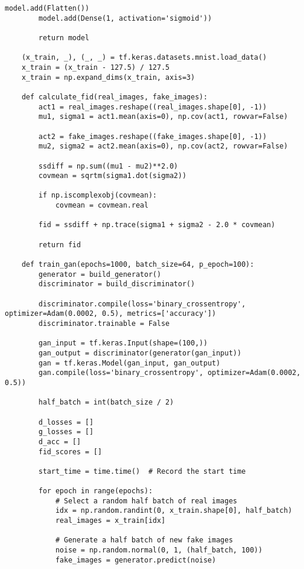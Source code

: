 \begin{lstlisting}[style=mypython, caption= {Explore GAN with 4 Convolutional Layers in Generator \\ and 3 Convolutional Layers in Discriminator}]
        model.add(Flatten())
        model.add(Dense(1, activation='sigmoid'))
    
        return model
    
    (x_train, _), (_, _) = tf.keras.datasets.mnist.load_data()
    x_train = (x_train - 127.5) / 127.5
    x_train = np.expand_dims(x_train, axis=3)
    
    def calculate_fid(real_images, fake_images):
        act1 = real_images.reshape((real_images.shape[0], -1))
        mu1, sigma1 = act1.mean(axis=0), np.cov(act1, rowvar=False)
        
        act2 = fake_images.reshape((fake_images.shape[0], -1))
        mu2, sigma2 = act2.mean(axis=0), np.cov(act2, rowvar=False)
        
        ssdiff = np.sum((mu1 - mu2)**2.0)
        covmean = sqrtm(sigma1.dot(sigma2))
        
        if np.iscomplexobj(covmean):
            covmean = covmean.real
        
        fid = ssdiff + np.trace(sigma1 + sigma2 - 2.0 * covmean)
        
        return fid
    
    def train_gan(epochs=1000, batch_size=64, p_epoch=100):
        generator = build_generator()
        discriminator = build_discriminator()
    
        discriminator.compile(loss='binary_crossentropy', optimizer=Adam(0.0002, 0.5), metrics=['accuracy'])
        discriminator.trainable = False
    
        gan_input = tf.keras.Input(shape=(100,))
        gan_output = discriminator(generator(gan_input))
        gan = tf.keras.Model(gan_input, gan_output)
        gan.compile(loss='binary_crossentropy', optimizer=Adam(0.0002, 0.5))
    
        half_batch = int(batch_size / 2)
        
        d_losses = []
        g_losses = []
        d_acc = []
        fid_scores = []
        
        start_time = time.time()  # Record the start time
    
        for epoch in range(epochs):
            # Select a random half batch of real images
            idx = np.random.randint(0, x_train.shape[0], half_batch)
            real_images = x_train[idx]
    
            # Generate a half batch of new fake images
            noise = np.random.normal(0, 1, (half_batch, 100))
            fake_images = generator.predict(noise)
    

\end{lstlisting}
